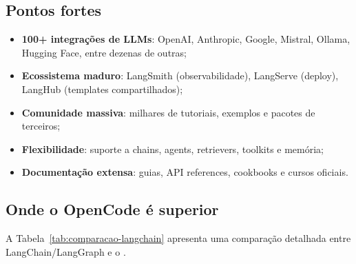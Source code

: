 \subsection{Pontos fortes}

\begin{itemize}
    \item \textbf{100+ integrações de LLMs}: OpenAI, Anthropic, Google,
          Mistral, Ollama, Hugging Face, entre dezenas de outras;
    \item \textbf{Ecossistema maduro}: LangSmith (observabilidade),
          LangServe (deploy), LangHub (templates compartilhados);
    \item \textbf{Comunidade massiva}: milhares de tutoriais, exemplos e
          pacotes de terceiros;
    \item \textbf{Flexibilidade}: suporte a chains, agents, retrievers,
          toolkits e memória;
    \item \textbf{Documentação extensa}: guias, API references,
          cookbooks e cursos oficiais.
\end{itemize}

\subsection{Onde o OpenCode é superior}

A Tabela~\ref{tab:comparacao-langchain} apresenta uma comparação
detalhada entre LangChain/LangGraph e o \opencodeeco{}.


